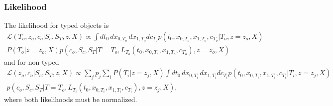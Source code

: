 \documentclass[preprint,3p]{elsarticle}
\begin{document}
\subsubsection{Likelihood}
The likelihood for typed objects is
\begin{multline}
\mathcal{L}(T_o,z_o,c_o | S_c, S_T, z, X)
 \propto \int dt_0 \, dx_{0,T_o} \, dx_{1,T_o} dc_{T_o} 
 p(t_0, x_{0,T_o}, x_{1,T_o}, c_{T_o} |T_o, z=z_o, X) \\ P(T_o|z=z_o, X) p(c_o, S_c, S_T | T=T_o, L_{T_o}(t_0, x_{0,T_o}, x_{1,T_o}, c_{T_o}), z=z_o, X)
\end{multline}
and for non-typed
\begin{multline}
\mathcal{L}(z_o,c_o | S_c, S_T, z, X)
 \propto \sum_j p_j \sum_i P(T_i|z=z_j, X)   \int dt_0 \, dx_{0,T_i} \, dx_{1,T_i} dc_{T_i} 
 p(t_0, x_{0,T_i}, x_{1,T_i}, c_{T_i} |T_i, z=z_j, X) \\  p(c_o, S_c, S_T | T=T_o, L_{T_i}(t_0, x_{0,T_i}, x_{1,T_i}, c_{T_i}), z=z_j, X),
 \end{multline}
where both likelihoods must be normalized.
\end{document}
